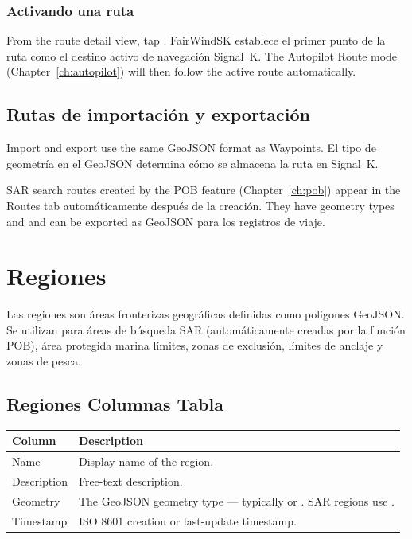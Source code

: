 \subsection{Activando una ruta}

From the route detail view, tap .
FairWindSK establece el primer punto de la ruta como el destino activo de navegación Signal~K.
The Autopilot Route mode (Chapter~\ref{ch:autopilot}) will then follow the active route automatically.

\section{Rutas de importación y exportación}

Import and export use the same GeoJSON  format as Waypoints.
El tipo de geometría en el GeoJSON determina cómo se almacena la ruta en Signal~K.

\begin{tipbox}
SAR search routes created by the POB feature (Chapter~\ref{ch:pob}) appear in the Routes tab
automáticamente después de la creación.
They have geometry types  and  and can be exported as GeoJSON
para los registros de viaje.
\end{tipbox}

\chapter{Regiones}
\label{ch:regions}

Las regiones son áreas fronterizas geográficas definidas como poligones GeoJSON.
Se utilizan para áreas de búsqueda SAR (automáticamente creadas por la función POB), área protegida marina
límites, zonas de exclusión, límites de anclaje y zonas de pesca.


\section{Regiones Columnas Tabla}

\begin{longtable}{L{2.4cm} L{11.3cm}}
\toprule
{}
{\sffamily\bfseries\color{white} Column} &
{\sffamily\bfseries\color{white} Description} \\
\midrule
Name & Display name of the region. \\
Description & Free-text description. \\
Geometry & The GeoJSON geometry type --- typically  or . SAR regions use . \\
Timestamp & ISO 8601 creation or last-update timestamp. \\
\bottomrule
\end{longtable}

